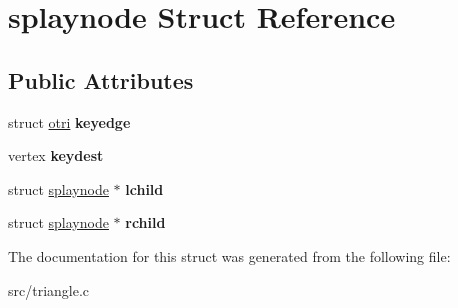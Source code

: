 \hypertarget{structsplaynode}{
\section{splaynode Struct Reference}
\label{structsplaynode}
}
\subsection*{Public Attributes}
\begin{DoxyCompactItemize}
\item 
\hypertarget{structsplaynode_aaa9fc6e2d568c0be2a5a4c0831965c4f}{
struct \hyperlink{structotri}{otri} {\bfseries keyedge}}
\label{structsplaynode_aaa9fc6e2d568c0be2a5a4c0831965c4f}

\item 
\hypertarget{structsplaynode_a63438aac02b8993141ebf848c347098d}{
vertex {\bfseries keydest}}
\label{structsplaynode_a63438aac02b8993141ebf848c347098d}

\item 
\hypertarget{structsplaynode_a67b52cb89e958acbdf9761ea4aab6813}{
struct \hyperlink{structsplaynode}{splaynode} $\ast$ {\bfseries lchild}}
\label{structsplaynode_a67b52cb89e958acbdf9761ea4aab6813}

\item 
\hypertarget{structsplaynode_ac1cf5f799931eda1315037dc7d0bce3a}{
struct \hyperlink{structsplaynode}{splaynode} $\ast$ {\bfseries rchild}}
\label{structsplaynode_ac1cf5f799931eda1315037dc7d0bce3a}

\end{DoxyCompactItemize}


The documentation for this struct was generated from the following file:\begin{DoxyCompactItemize}
\item 
src/triangle.c\end{DoxyCompactItemize}
